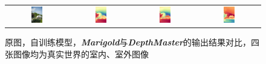 \documentclass{article}
\begin{document}
\begin{figure}[H]
\begin{tabular}{cccc}
    \includegraphics[width=0.2\textwidth]{images/test-image/outside-02.jpg} &
    \includegraphics[width=0.2\textwidth]{images/trained/outside-02_pred_colored.png} &
    \includegraphics[width=0.2\textwidth]{images/pretrained/outside-02_pred_colored.png} &
    \includegraphics[width=0.2\textwidth]{images/depthmaster/outside-02_pred_colored.jpg} \\
  \end{tabular}
  \caption{原图，自训练模型，\textit{\textbf{Marigold}}与\textit{\textbf{DepthMaster}}的输出结果对比，四张图像均为真实世界的室内、室外图像}
\end{figure}

\newpage
\end{document}
